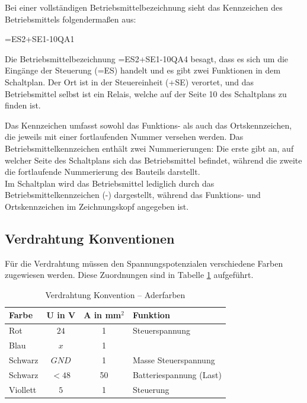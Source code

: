 Bei einer vollständigen Betriebsmittelbezeichnung sieht das Kennzeichen des Betriebsmittels folgendermaßen aus:

\begin{center} =ES2+SE1-10QA1 \end{center}

Die Betriebsmittelbezeichnung =ES2+SE1-10QA4 besagt, dass es sich um die Eingänge der Steuerung (=ES) handelt und es gibt zwei Funktionen in dem Schaltplan. Der Ort ist in der Steuereinheit (+SE) verortet, und das Betriebsmittel selbst ist ein Relais, welche auf der Seite 10 des Schaltplans zu finden ist.

Das Kennzeichen umfasst sowohl das Funktions- als auch das Ortskennzeichen, die jeweils mit einer fortlaufenden Nummer versehen werden. Das Betriebsmittelkennzeichen enthält zwei Nummerierungen: Die erste gibt an, auf welcher Seite des Schaltplans sich das Betriebsmittel befindet, während die zweite die fortlaufende Nummerierung des Bauteils darstellt.\\
Im Schaltplan wird das Betriebsmittel lediglich durch das Betriebsmittelkennzeichen (-) dargestellt, während das Funktions- und Ortskennzeichen im Zeichnungskopf angegeben ist.

\newpage

\subsection{Verdrahtung Konventionen}
\label{section:Verdrahtung_Konventionen}
Für die Verdrahtung müssen den Spannungspotenzialen verschiedene Farben zugewiesen werden. Diese Zuordnungen sind in Tabelle \ref{Verdrahtung_Konventionen:tab:Zuordnung} aufgeführt.
\pagebreak[1]
\begin{table}[!ht]
	\centering
	\caption{Verdrahtung Konvention – Aderfarben}
	\label{Verdrahtung_Konventionen:tab:Zuordnung}
	\begin{tabular}{lccl}
		\hline
		\textbf{Farbe}                & \textbf{U in V} & \textbf{A in mm$^2$} & \textbf{Funktion}       \\ \hline
		\multicolumn{1}{l|}{Rot}      & $24$            & 1                    & Steuerspannung          \\
		\multicolumn{1}{l|}{Blau}     & $x$             & 1                    &                         \\
		\multicolumn{1}{l|}{Schwarz}  & $GND$           & 1                    & Masse Steuerspannung    \\
		\multicolumn{1}{l|}{Schwarz}  & $< 48$          & 50                   & Batteriespannung (Last) \\
		\multicolumn{1}{l|}{Viollett} & $5$             & 1                    & Steuerung               \\ \hline
	\end{tabular}
\end{table}
\pagebreak[4]

